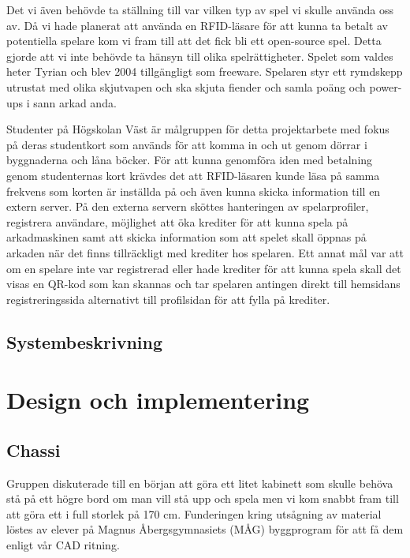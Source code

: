 \documentclass[12pt,fleqn,openany]{book} %
\begin{document}
Det vi även behövde ta ställning till var vilken typ av spel vi skulle använda oss av. Då vi hade planerat att använda en RFID-läsare 
för att kunna ta betalt av potentiella spelare kom vi fram till att det fick bli ett open-source spel. Detta gjorde att vi inte behövde 
ta hänsyn till olika spelrättigheter. Spelet som valdes heter Tyrian och blev 2004 tillgängligt som freeware. Spelaren styr ett rymdskepp 
utrustat med olika skjutvapen och ska skjuta fiender och samla poäng och power-ups i sann arkad anda.
\bigskip

Studenter på Högskolan Väst är målgruppen för detta projektarbete med fokus på deras studentkort som används för att komma in och ut genom 
dörrar i byggnaderna och låna böcker. För att kunna genomföra iden med betalning genom studenternas kort krävdes det att RFID-läsaren kunde 
läsa på samma frekvens som korten är inställda på och även kunna skicka information till en extern server. På den externa servern sköttes 
hanteringen av spelarprofiler, registrera användare, möjlighet att öka krediter för att kunna spela på arkadmaskinen samt att skicka 
information som att spelet skall öppnas på arkaden när det finns tillräckligt med krediter hos spelaren. Ett annat mål var att om en 
spelare inte var registrerad eller hade krediter för att kunna spela skall det visas en QR-kod som kan skannas och tar spelaren antingen 
direkt till hemsidans registreringssida alternativt till profilsidan för att fylla på krediter.

\section{Systembeskrivning}


\chapter{Design och implementering}
\section{Chassi}
Gruppen diskuterade till en början att göra ett litet kabinett som skulle behöva stå på ett högre bord om man vill stå upp 
och spela men vi kom snabbt fram till att göra ett i full storlek på 170 cm. Funderingen kring utsågning av material löstes av 
elever på Magnus Åbergsgymnasiets (MÅG) byggprogram för att få dem enligt vår CAD ritning.
\end{document}
